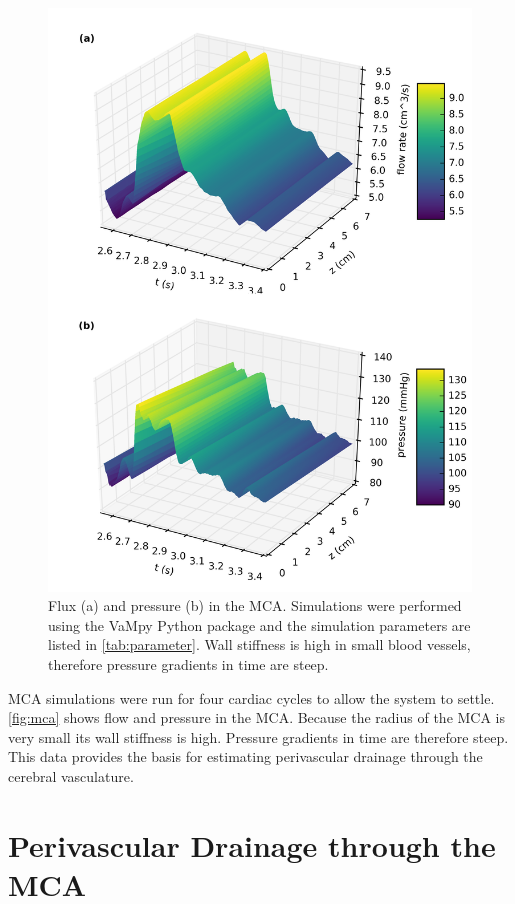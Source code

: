 \documentclass[a4paper,titlepage]{scrartcl}
\begin{document}
\begin{figure}
\centerline{\includegraphics{figures/mca.png}}
\caption{Flux (a) and pressure (b) in the MCA. Simulations were performed using the VaMpy Python package \cite{Diem2016a} and the simulation parameters are listed in \autoref{tab:parameter}. Wall stiffness is high in small blood vessels, therefore pressure gradients in time are steep.\label{fig:mca}}
\end{figure}

MCA simulations were run for four cardiac cycles to allow the system to settle. \autoref{fig:mca} shows flow and pressure in the MCA. Because the radius of the MCA is very small its wall stiffness is high. Pressure gradients in time are therefore steep. This data provides the basis for estimating perivascular drainage through the cerebral vasculature.


\section{Perivascular Drainage through the MCA}
\end{document}
